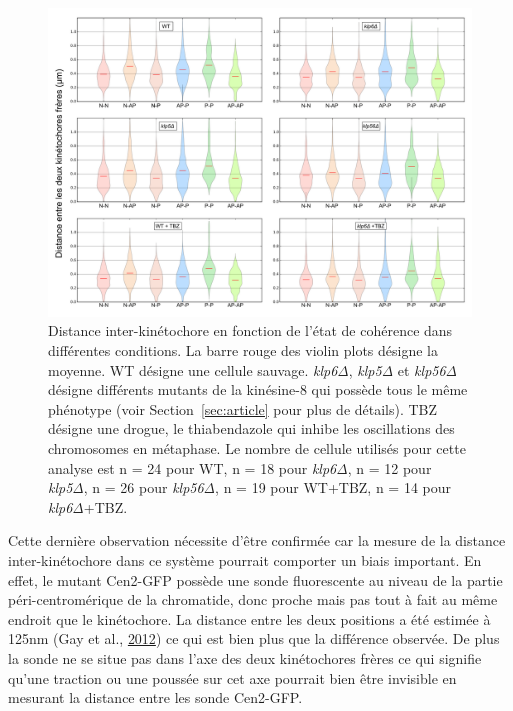 \documentclass[12pt,a4paper,twoside,openright]{book}
\begin{document}
\begin{figure}[htbp]
\centering
\includegraphics{figures/results/imaging/coherence_stretch.png}
\caption[Distance inter-kinétochore en fonction de l'état de cohérence dans différentes conditions]{\label{fig:coherence_stretch}Distance
inter-kinétochore en fonction de l'état de cohérence dans différentes
conditions. La barre rouge des violin plots désigne la moyenne. WT
désigne une cellule sauvage. \emph{klp6Δ}, \emph{klp5Δ} et \emph{klp56Δ}
désigne différents mutants de la kinésine-8 qui possède tous le même
phénotype (voir Section~\ref{sec:article} pour plus de détails). TBZ
désigne une drogue, le thiabendazole qui inhibe les oscillations des
chromosomes en métaphase. Le nombre de cellule utilisés pour cette
analyse est n = 24 pour WT, n = 18 pour \emph{klp6Δ}, n = 12 pour
\emph{klp5Δ}, n = 26 pour \emph{klp56Δ}, n = 19 pour WT+TBZ, n = 14 pour
\emph{klp6Δ}+TBZ.}
\end{figure}

Cette dernière observation nécessite d'être confirmée car la mesure de
la distance inter-kinétochore dans ce système pourrait comporter un
biais important. En effet, le mutant Cen2-GFP possède une sonde
fluorescente au niveau de la partie péri-centromérique de la chromatide,
donc proche mais pas tout à fait au même endroit que le kinétochore. La
distance entre les deux positions a été estimée à 125nm (Gay et al.,
\protect\hyperlink{ref-Gay2012a}{2012}) ce qui est bien plus que la
différence observée. De plus la sonde ne se situe pas dans l'axe des
deux kinétochores frères ce qui signifie qu'une traction ou une poussée
sur cet axe pourrait bien être invisible en mesurant la distance entre
les sonde Cen2-GFP.
\end{document}

